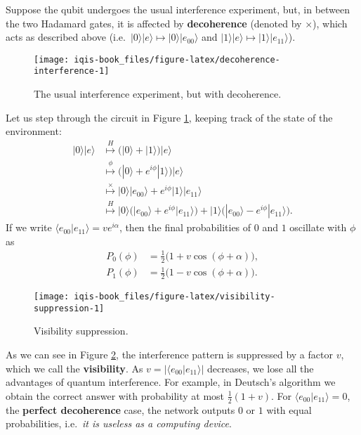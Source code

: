 \documentclass[fleqn]{article}
\begin{document}
Suppose the qubit undergoes the usual interference experiment, but, in between the two Hadamard gates, it is affected by \textbf{decoherence} (denoted by \(\times\)), which acts as described above (i.e.~\(|0\rangle|e\rangle\mapsto|0\rangle|e_{00}\rangle\) and \(|1\rangle|e\rangle\mapsto|1\rangle|e_{11}\rangle\)).

\begin{figure}[H]

{\centering \texttt{[image: iqis-book\_files/figure-latex/decoherence-interference-1]} 

}

\caption{The usual interference experiment, but with decoherence.}\label{fig:decoherence-interference}
\end{figure}

Let us step through the circuit in Figure \ref{fig:decoherence-interference}, keeping track of the state of the environment:
\[
  \begin{aligned}
    |0\rangle|e\rangle
    & \overset{H}{\longmapsto} \Big( |0\rangle + |1\rangle \Big) |e\rangle
  \\& \overset{\phi}{\longmapsto} \Big( |0\rangle + e^{i\phi}|1\rangle \Big) |e\rangle
  \\& \overset{\times}{\longmapsto} |0\rangle|e_{00}\rangle + e^{i\phi}|1\rangle|e_{11}\rangle
  \\& \overset{H}{\longmapsto} |0\rangle\Big( |e_{00}\rangle + e^{i\phi}|e_{11}\rangle \Big) + |1\rangle\Big( |e_{00}\rangle - e^{i\phi}|e_{11}\rangle \Big).
  \end{aligned}
\]
If we write \(\langle e_{00}|e_{11}\rangle = ve^{i\alpha}\), then the final probabilities of \(0\) and \(1\) oscillate with \(\phi\) as
\[
  \begin{aligned}
    P_{0}(\phi) &= \frac12\big(1 + v\cos(\phi + \alpha)\big),
  \\P_{1}(\phi) &= \frac12\big(1 - v\cos(\phi + \alpha)\big).
  \end{aligned}
\]

\begin{figure}[H]

{\centering \texttt{[image: iqis-book\_files/figure-latex/visibility-suppression-1]} 

}

\caption{Visibility suppression.}\label{fig:visibility-suppression}
\end{figure}

As we can see in Figure \ref{fig:visibility-suppression}, the interference pattern is suppressed by a factor \(v\), which we call the \textbf{visibility}.
As \(v=|\langle e_{00}|e_{11}\rangle|\) decreases, we lose all the advantages of quantum interference.
For example, in Deutsch's algorithm we obtain the correct answer with probability at most \(\frac12(1+v)\).
For \(\langle e_{00}|e_{11}\rangle = 0\), the \textbf{perfect decoherence} case, the network outputs \(0\) or \(1\) with equal probabilities, i.e.~\emph{it is useless as a computing device}.
\end{document}
